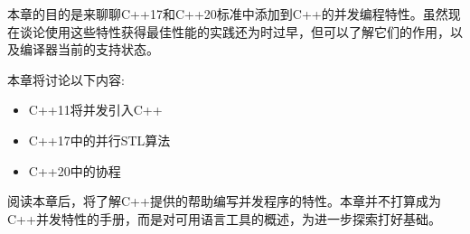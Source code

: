 本章的目的是来聊聊C++17和C++20标准中添加到C++的并发编程特性。虽然现在谈论使用这些特性获得最佳性能的实践还为时过早，但可以了解它们的作用，以及编译器当前的支持状态。

本章将讨论以下内容:

\begin{itemize}
\item
C++11将并发引入C++

\item
C++17中的并行STL算法

\item
C++20中的协程
\end{itemize}

阅读本章后，将了解C++提供的帮助编写并发程序的特性。本章并不打算成为C++并发特性的手册，而是对可用语言工具的概述，为进一步探索打好基础。